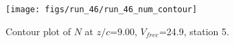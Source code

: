 \begin{figure}[H]
\centering
\texttt{[image: figs/run\_46/run\_46\_num\_contour]}
\caption{Contour plot of $N$ at $z/c$=9.00, $V_{free}$=24.9, station 5.}
\end{figure}


